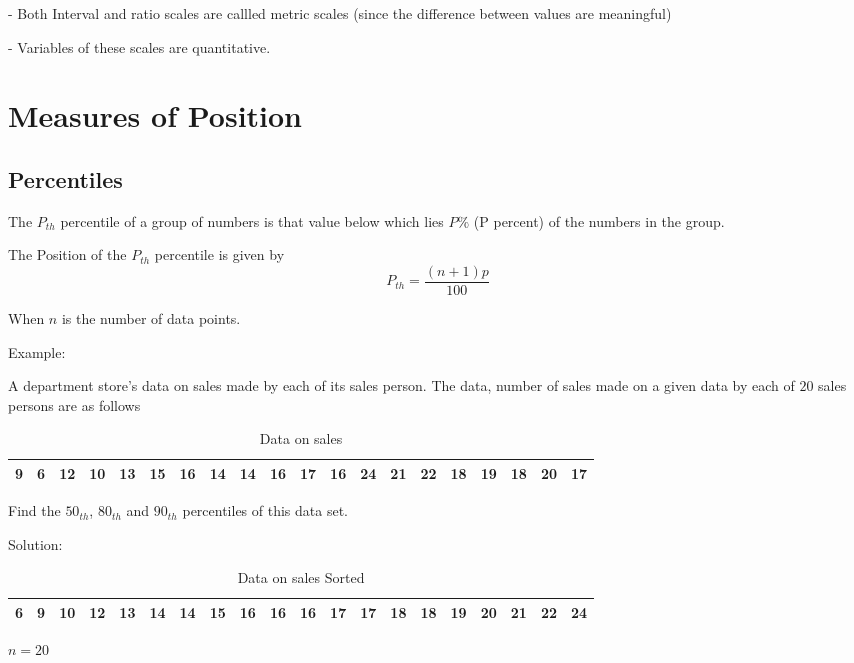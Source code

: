 \documentclass[12pt,a4paper]{article}
\begin{document}
- Both Interval and ratio scales are callled metric scales (since the difference between values are meaningful)

- Variables of these scales are quantitative.

\section{Measures of Position}

\subsection{Percentiles}
The $P_{th}$ percentile of a group of numbers is that value below which lies $P\%$ (P percent) of the numbers in the group.

The Position of the $P_{th}$ percentile is given by
\begin{equation}
    P_{th} = \frac{(n+1)p}{100}
\end{equation}

When $n$ is the number of data points.

Example:

A department store's data on sales made by each  of its sales person. The data, number of sales made on a given data by each of $20$ sales persons are as follows
\begin{table}[H]
    \centering
    \caption{Data on sales}
    \begin{tabular}{|*{20}{c|}}

        \hline
        9  & 6  & 12 & 10 & 13 & 15 & 16 & 14 & 14 & 16 &
        17 & 16 & 24 & 21 & 22 & 18 & 19 & 18 & 20 & 17   \\
        \hline
    \end{tabular}
\end{table}


Find the $50_{th}$, $80_{th}$ and $90_{th}$ percentiles of this data set.

Solution:
\begin{table}[H]
    \centering
    \caption{Data on sales Sorted}
    \begin{tabular}{|*{20}{c|}}

        \hline
        6 & 9 & 10 & 12 & 13 & 14 & 14 & 15 & 16 & 16 & 16 & 17 & 17 & 18 & 18 & 19 & 20 & 21 & 22 & 24 \\
        \hline
    \end{tabular}
\end{table}

$n = 20$
\end{document}
